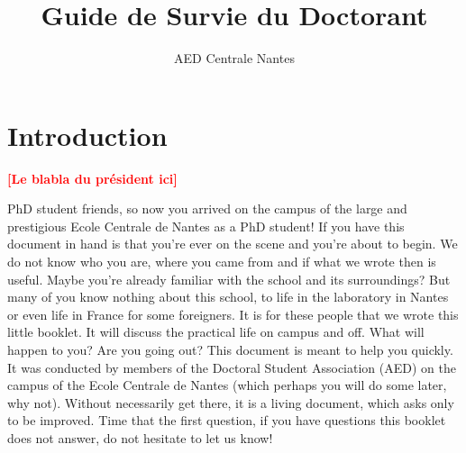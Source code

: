\documentclass[11pt]{report}
\title{Guide de Survie du Doctorant}
\author{AED Centrale Nantes}
\newcommand{\todo}[1]{\textcolor{red}{\textbf{[#1]}}}
\begin{document}

\setcounter{page}{0}
\tableofcontents

\newpage
\chapter*{Introduction}
\todo{Le blabla du président ici}

PhD student friends, so now you arrived on the campus of the large and prestigious Ecole Centrale de Nantes as a PhD student! If you have this document in hand is that you're ever on the scene and you're about to begin. We do not know who you are, where you came from and if what we wrote then is useful. Maybe you're already familiar with the school and its surroundings? But many of you know nothing about this school, to life in the laboratory in Nantes or even life in France for some foreigners. It is for these people that we wrote this little booklet. It will discuss the practical life on campus and off. What will happen to you? Are you going out? This document is meant to help you quickly. It was conducted by members of the Doctoral Student Association (AED) on the campus of the Ecole Centrale de Nantes (which perhaps you will do some later, why not). Without necessarily get there, it is a living document, which asks only to be improved. Time that the first question, if you have questions this booklet does not answer, do not hesitate to let us know!





\end{document}
